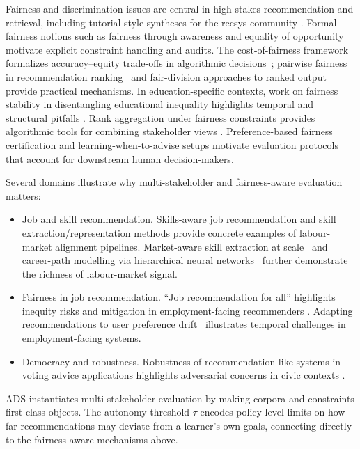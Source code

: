 \documentclass[sigconf,review]{acmart}
\begin{document}
Fairness and discrimination issues are central in high-stakes recommendation and retrieval, including tutorial-style syntheses for the recsys community \cite{ekstrand2019fairness}.
Formal fairness notions such as fairness through awareness \cite{dwork2012fairness} and equality of opportunity \cite{hardt2016equality} motivate explicit constraint handling and audits.
The cost-of-fairness framework formalizes accuracy--equity trade-offs in algorithmic decisions~\cite{corbettdavies2017cost}; pairwise fairness in recommendation ranking~\cite{beutel2019fairness} and fair-division approaches to ranked output~\cite{saito2022fair} provide practical mechanisms.
In education-specific contexts, work on fairness stability in disentangling educational inequality highlights temporal and structural pitfalls \cite{fairdas2024}.
Rank aggregation under fairness constraints provides algorithmic tools for combining stakeholder views \cite{fairRankAgg2025}.
Preference-based fairness certification \cite{prefFairCert2023} and learning-when-to-advise setups \cite{advise2023} motivate evaluation protocols that account for downstream human decision-makers.

Several domains illustrate why multi-stakeholder and fairness-aware evaluation matters:
\begin{itemize}
    \item {Job and skill recommendation.} Skills-aware job recommendation and skill extraction/representation methods \cite{giabelli2021skills2job,kara2022skillEmbeddings,leon2024transversalSkills} provide concrete examples of labour-market alignment pipelines. Market-aware skill extraction at scale~\cite{shi2020job2skills} and career-path modelling via hierarchical neural networks~\cite{meng2019career} further demonstrate the richness of labour-market signal.
    \item {Fairness in job recommendation.} ``Job recommendation for all'' highlights inequity risks and mitigation in employment-facing recommenders \cite{bied2023jobrecforall}. Adapting recommendations to user preference drift~\cite{han2024bistro} illustrates temporal challenges in employment-facing systems.
    \item {Democracy and robustness.} Robustness of recommendation-like systems in voting advice applications highlights adversarial concerns in civic contexts \cite{berdoz2025democracy}.
\end{itemize}

\noindent
ADS instantiates multi-stakeholder evaluation by making corpora and constraints first-class objects. The autonomy threshold $\tau$ encodes policy-level limits on how far recommendations may deviate from a learner's own goals, connecting directly to the fairness-aware mechanisms above.
\end{document}
